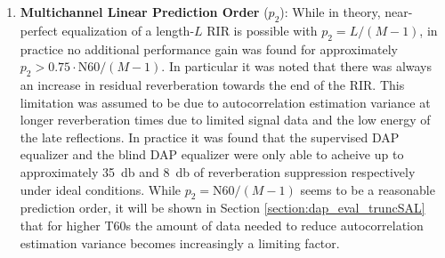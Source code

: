 \begin{enumerate}
	\item \textbf{Multichannel Linear Prediction Order} ($p_2$): While in theory, near-perfect equalization of a length-$L$ RIR is possible with $p_2 = L / \left(M-1\right)$, in practice no additional performance gain was found for approximately $p_2 > 0.75 \cdot \mathrm{N60} / \left(M-1\right)$. In particular it was noted that there was always an increase in residual reverberation towards the end of the RIR. This limitation was assumed to be due to autocorrelation estimation variance at longer reverberation times due to limited signal data and the low energy of the late reflections. In practice it was found that the supervised DAP equalizer and the blind DAP equalizer were only able to acheive up to approximately \qty{35}{\decibel} and \qty{8}{\decibel} of reverberation suppression respectively under ideal conditions. While $p_2=\mathrm{N60}/\left(M-1\right)$ seems to be a reasonable prediction order, it will be shown in Section \ref{section:dap_eval_truncSAL} that for higher T60s the amount of data needed to reduce autocorrelation estimation variance becomes increasingly a limiting factor.
	

\end{enumerate}
